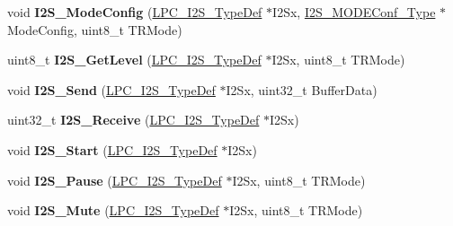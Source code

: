 \begin{DoxyCompactItemize}
\item 
\hypertarget{group___i2_s___public___functions_ga7d8cfff004942141fd752ac42319fcb3}{void {\bfseries \-I2\-S\-\_\-\-Mode\-Config} (\hyperlink{struct_l_p_c___i2_s___type_def}{\-L\-P\-C\-\_\-\-I2\-S\-\_\-\-Type\-Def} $\ast$\-I2\-Sx, \hyperlink{struct_i2_s___m_o_d_e_conf___type}{\-I2\-S\-\_\-\-M\-O\-D\-E\-Conf\-\_\-\-Type} $\ast$\-Mode\-Config, uint8\-\_\-t \-T\-R\-Mode)}\label{group___i2_s___public___functions_ga7d8cfff004942141fd752ac42319fcb3}

\item 
\hypertarget{group___i2_s___public___functions_ga21b61189ba284a0e019accfce942351e}{uint8\-\_\-t {\bfseries \-I2\-S\-\_\-\-Get\-Level} (\hyperlink{struct_l_p_c___i2_s___type_def}{\-L\-P\-C\-\_\-\-I2\-S\-\_\-\-Type\-Def} $\ast$\-I2\-Sx, uint8\-\_\-t \-T\-R\-Mode)}\label{group___i2_s___public___functions_ga21b61189ba284a0e019accfce942351e}

\item 
\hypertarget{group___i2_s___public___functions_ga7dcb8c4fd0dfb7550d515bfa70227f9c}{void {\bfseries \-I2\-S\-\_\-\-Send} (\hyperlink{struct_l_p_c___i2_s___type_def}{\-L\-P\-C\-\_\-\-I2\-S\-\_\-\-Type\-Def} $\ast$\-I2\-Sx, uint32\-\_\-t \-Buffer\-Data)}\label{group___i2_s___public___functions_ga7dcb8c4fd0dfb7550d515bfa70227f9c}

\item 
\hypertarget{group___i2_s___public___functions_ga11453c815c5f46c6092007e6a4b62947}{uint32\-\_\-t {\bfseries \-I2\-S\-\_\-\-Receive} (\hyperlink{struct_l_p_c___i2_s___type_def}{\-L\-P\-C\-\_\-\-I2\-S\-\_\-\-Type\-Def} $\ast$\-I2\-Sx)}\label{group___i2_s___public___functions_ga11453c815c5f46c6092007e6a4b62947}

\item 
\hypertarget{group___i2_s___public___functions_ga0094893a54f2a8b31642f5ff8069ccad}{void {\bfseries \-I2\-S\-\_\-\-Start} (\hyperlink{struct_l_p_c___i2_s___type_def}{\-L\-P\-C\-\_\-\-I2\-S\-\_\-\-Type\-Def} $\ast$\-I2\-Sx)}\label{group___i2_s___public___functions_ga0094893a54f2a8b31642f5ff8069ccad}

\item 
\hypertarget{group___i2_s___public___functions_ga1753457ea5d62c26e44fcd99ce1d0da3}{void {\bfseries \-I2\-S\-\_\-\-Pause} (\hyperlink{struct_l_p_c___i2_s___type_def}{\-L\-P\-C\-\_\-\-I2\-S\-\_\-\-Type\-Def} $\ast$\-I2\-Sx, uint8\-\_\-t \-T\-R\-Mode)}\label{group___i2_s___public___functions_ga1753457ea5d62c26e44fcd99ce1d0da3}

\item 
\hypertarget{group___i2_s___public___functions_gae465687afdd694319dce5e6ade895c52}{void {\bfseries \-I2\-S\-\_\-\-Mute} (\hyperlink{struct_l_p_c___i2_s___type_def}{\-L\-P\-C\-\_\-\-I2\-S\-\_\-\-Type\-Def} $\ast$\-I2\-Sx, uint8\-\_\-t \-T\-R\-Mode)}\label{group___i2_s___public___functions_gae465687afdd694319dce5e6ade895c52}


\end{DoxyCompactItemize}
